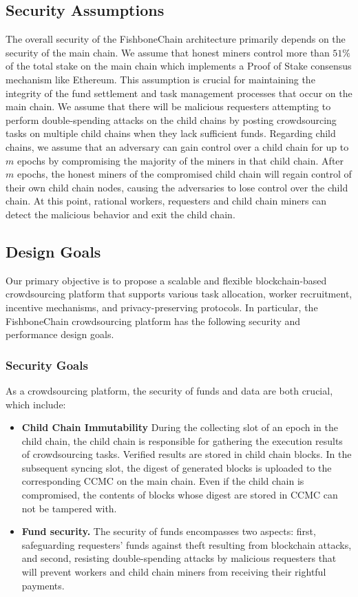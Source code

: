\documentclass[10pt,journal]{IEEEtran}
\begin{document}
\subsection{Security Assumptions}\label{subsec:security_assumption}
    The overall security of the FishboneChain architecture primarily depends on the security of the main chain. We assume that honest miners control more than $51\%$ of the total stake on the main chain which implements a Proof of Stake consensus mechanism like Ethereum. This assumption is crucial for maintaining the integrity of the fund settlement and task management processes that occur on the main chain. We assume that there will be malicious requesters attempting to perform double-spending attacks on the child chains by posting crowdsourcing tasks on multiple child chains when they lack sufficient funds. Regarding child chains, we assume that an adversary can gain control over a child chain for up to $m$ epochs by compromising the majority of the miners in that child chain. After $m$ epochs, the honest miners of the compromised child chain will regain control of their own child chain nodes, causing the adversaries to lose control over the child chain. At this point, rational workers, requesters and child chain miners can detect the malicious behavior and exit the child chain.

\subsection{Design Goals}\label{subsec:design_goals}

Our primary objective is to propose a scalable and flexible blockchain-based crowdsourcing platform that supports various task allocation, worker recruitment, incentive mechanisms, and privacy-preserving protocols. In particular, the FishboneChain crowdsourcing platform has the following security and performance design goals.

\subsubsection{\textbf{Security Goals}}
As a crowdsourcing platform, the security of funds and data are both crucial, which include:
\begin{itemize}
    \item \textbf{Child Chain Immutability}
            During the collecting slot of an epoch in the child chain, the child chain is responsible for gathering the execution results of crowdsourcing tasks. Verified results are stored in child chain blocks. In the subsequent syncing slot, the digest of generated blocks is uploaded to the corresponding CCMC on the main chain. Even if the child chain is compromised, the contents of blocks whose digest are stored in CCMC can not be tampered with.
    \item \textbf{Fund security.}
          The security of funds encompasses two aspects: first, safeguarding requesters' funds against theft resulting from blockchain attacks, and second, resisting double-spending attacks by malicious requesters that will prevent workers and child chain miners from receiving their rightful payments.
\end{itemize}
\end{document}
